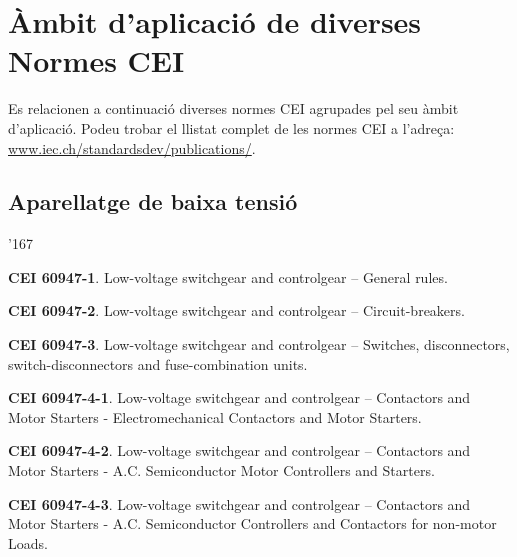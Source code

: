 \section{\`{A}mbit d'aplicaci\'{o} de diverses Normes CEI}\label{sec:normes_IEC}

Es relacionen a continuaci\'{o} diverses normes \textsf{CEI} agrupades pel seu \`{a}mbit d'aplicaci\'{o}. Podeu trobar el llistat complet de les normes \textsf{CEI} a l'adre\c{c}a: \href{http://www.iec.ch/standardsdev/publications/}{www.iec.ch/standardsdev/publications/}.

\subsection*{Aparellatge de baixa tensi\'{o}}
\begin{dinglist}{'167}
    \item \textbf{CEI 60947-1}. Low-voltage switchgear and controlgear -- General rules.
    \item \textbf{CEI 60947-2}. Low-voltage switchgear and controlgear -- Circuit-breakers.
    \item \textbf{CEI 60947-3}. Low-voltage switchgear and controlgear -- Switches, disconnectors, switch-disconnectors and fuse-combination units.
    \item \textbf{CEI 60947-4-1}. Low-voltage switchgear and controlgear -- Contactors and Motor Starters - Electromechanical Contactors and Motor Starters.
    \item \textbf{CEI 60947-4-2}. Low-voltage switchgear and controlgear -- Contactors and Motor Starters - A.C. Semiconductor Motor Controllers and Starters.
    \item \textbf{CEI 60947-4-3}. Low-voltage switchgear and controlgear -- Contactors and Motor Starters - A.C. Semiconductor Controllers and Contactors for non-motor Loads.
\end{dinglist}

